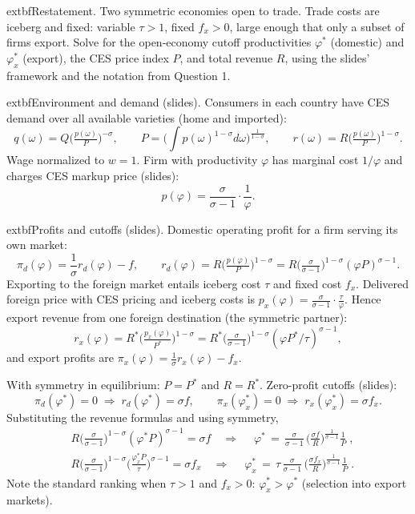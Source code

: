 \begin{solution}
	extbf{Restatement.} Two symmetric economies open to trade. Trade costs are iceberg and fixed: variable $\tau>1$, fixed $f_x>0$, large enough that only a subset of firms export. Solve for the open-economy cutoff productivities $\varphi^*$ (domestic) and $\varphi_x^*$ (export), the CES price index $P$, and total revenue $R$, using the slides’ framework and the notation from Question 1.

\bigskip
	extbf{Environment and demand (slides).}
Consumers in each country have CES demand over all available varieties (home and imported):
\[
q(\omega) = Q \Big(\tfrac{p(\omega)}{P}\Big)^{-\sigma},\qquad 
P = \Big( \int p(\omega)^{1-\sigma} d\omega \Big)^{\tfrac{1}{1-\sigma}},\qquad r(\omega)=R\Big(\tfrac{p(\omega)}{P}\Big)^{1-\sigma}.
\]
Wage normalized to $w=1$. Firm with productivity $\varphi$ has marginal cost $1/\varphi$ and charges CES markup price (slides):
\[
p(\varphi) = \frac{\sigma}{\sigma-1}\cdot\frac{1}{\varphi}.
\]

\bigskip
	extbf{Profits and cutoffs (slides).}
Domestic operating profit for a firm serving its own market:
\[
\pi_d(\varphi) = \frac{1}{\sigma} r_d(\varphi) - f,\qquad r_d(\varphi)= R\Big(\tfrac{p(\varphi)}{P}\Big)^{1-\sigma} 
 = R\Big(\tfrac{\sigma}{\sigma-1}\Big)^{1-\sigma} (\varphi P)^{\sigma-1}.
\]
Exporting to the foreign market entails iceberg cost $\tau$ and fixed cost $f_x$. Delivered foreign price with CES pricing and iceberg costs is $p_x(\varphi)=\tfrac{\sigma}{\sigma-1}\cdot\tfrac{\tau}{\varphi}$. Hence export revenue from one foreign destination (the symmetric partner):
\[
r_x(\varphi) = R^* \Big(\tfrac{p_x(\varphi)}{P^*}\Big)^{1-\sigma} = R^*\Big(\tfrac{\sigma}{\sigma-1}\Big)^{1-\sigma} (\varphi P^*/\tau)^{\sigma-1},
\]
and export profits are $\pi_x(\varphi)=\tfrac{1}{\sigma} r_x(\varphi)-f_x$.

With symmetry in equilibrium: $P=P^*$ and $R=R^*$. Zero-profit cutoffs (slides):
\[
\pi_d(\varphi^*)=0 \;\Rightarrow\; r_d(\varphi^*)=\sigma f,
\qquad
\pi_x(\varphi_x^*)=0 \;\Rightarrow\; r_x(\varphi_x^*)=\sigma f_x.
\]
Substituting the revenue formulas and using symmetry,
\begin{align*}
&R\Big(\tfrac{\sigma}{\sigma-1}\Big)^{1-\sigma} (\varphi^* P)^{\sigma-1} = \sigma f
\quad\Rightarrow\quad
\boxed{\;\displaystyle \varphi^* \,=\, \frac{\sigma}{\sigma-1}\,\Big(\frac{\sigma f}{R}\Big)^{\!\tfrac{1}{\sigma-1}} \frac{1}{P} \;}, \\
&R\Big(\tfrac{\sigma}{\sigma-1}\Big)^{1-\sigma} \Big(\frac{\varphi_x^* P}{\tau}\Big)^{\sigma-1} = \sigma f_x
\quad\Rightarrow\quad
\boxed{\;\displaystyle \varphi_x^* \,=\, \tau\, \frac{\sigma}{\sigma-1}\,\Big(\frac{\sigma f_x}{R}\Big)^{\!\tfrac{1}{\sigma-1}} \frac{1}{P} \; }.
\end{align*}
Note the standard ranking when $\tau>1$ and $f_x>0$: $\varphi_x^*>\varphi^*$ (selection into export markets).


\end{solution}
